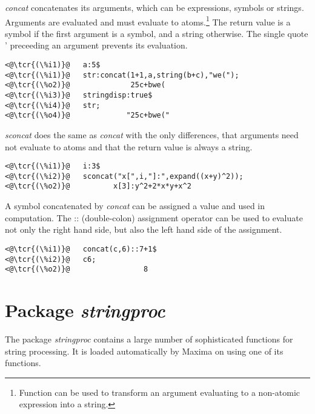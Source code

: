 \documentclass[../Maxima_Workbook.tex]{subfiles}
\begin{document}
\lz {} \hfill \tcr{[function]}

 \hfill \tcr{[function]}

\lz \emph{concat} concatenates its arguments, which can be expressions, symbols or strings. Arguments are evaluated and must evaluate to atoms.\footnote{Function  can be used to transform an argument evaluating to a non-atomic expression into a string.} The return value is a symbol if the first argument is a symbol, and a string otherwise. The single quote ' preceeding an argument prevents its evaluation.

\lz \begin{small}
\color{blue}
\begin{lstlisting}
<@\tcr{(\%i1)}@   a:5$
<@\tcr{(\%i1)}@   str:concat(1+1,a,string(b+c),"we(");
<@\tcr{(\%o2)}@			     25c+bwe(
<@\tcr{(\%i3)}@   stringdisp:true$
<@\tcr{(\%i4)}@   str;
<@\tcr{(\%o4)}@			    "25c+bwe("
\end{lstlisting}
\color{black}
\end{small}

\lz \emph{sconcat} does the same as \emph{concat} with the only differences, that arguments need not evaluate to atoms and that the return value is always a string. 

\lz \begin{small}
\color{blue}
\begin{lstlisting}
<@\tcr{(\%i1)}@   i:3$
<@\tcr{(\%i2)}@   sconcat("x[",i,"]:",expand((x+y)^2));
<@\tcr{(\%o2)}@			 x[3]:y^2+2*x*y+x^2 
\end{lstlisting}
\color{black}
\end{small}

\lz A symbol concatenated by \emph{concat} can be assigned a value and used in computation. The :: (double-colon) assignment operator can be used to evaluate not only the right hand side, but also the left hand side of the assignment.

\lz \begin{small}
\color{blue}
\begin{lstlisting}
<@\tcr{(\%i1)}@   concat(c,6)::7+1$
<@\tcr{(\%i2)}@   c6;
<@\tcr{(\%o2)}@			        8
\end{lstlisting}
\color{black}
\end{small}

\section{Package \emph{stringproc}}

The package \emph{stringproc} contains a large number of sophisticated functions for string processing. It is loaded automatically by Maxima on using one of its functions.
\end{document}
